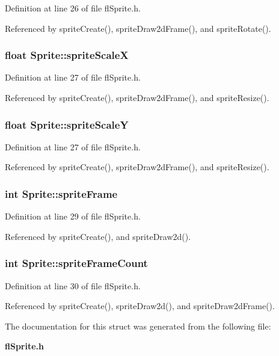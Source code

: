 Definition at line 26 of file fl\-Sprite.h.

Referenced by sprite\-Create(), sprite\-Draw2d\-Frame(), and sprite\-Rotate().
\subsubsection{\setlength{\rightskip}{0pt plus 5cm}float {\bf Sprite::sprite\-Scale\-X}}\label{structSprite_33570717a059bc615e310126bcacd72a}




Definition at line 27 of file fl\-Sprite.h.

Referenced by sprite\-Create(), sprite\-Draw2d\-Frame(), and sprite\-Resize().
\subsubsection{\setlength{\rightskip}{0pt plus 5cm}float {\bf Sprite::sprite\-Scale\-Y}}\label{structSprite_6e8db8b3dbfa9d54942f17b1720374b4}




Definition at line 27 of file fl\-Sprite.h.

Referenced by sprite\-Create(), sprite\-Draw2d\-Frame(), and sprite\-Resize().
\subsubsection{\setlength{\rightskip}{0pt plus 5cm}int {\bf Sprite::sprite\-Frame}}\label{structSprite_0fb5eef47c64f49c7f30d941ed2a96f6}




Definition at line 29 of file fl\-Sprite.h.

Referenced by sprite\-Create(), and sprite\-Draw2d().
\subsubsection{\setlength{\rightskip}{0pt plus 5cm}int {\bf Sprite::sprite\-Frame\-Count}}\label{structSprite_ddc1ed076c0d266807874a7e9f8f7880}




Definition at line 30 of file fl\-Sprite.h.

Referenced by sprite\-Create(), sprite\-Draw2d(), and sprite\-Draw2d\-Frame().

The documentation for this struct was generated from the following file:\begin{CompactItemize}
\item 
{\bf fl\-Sprite.h}\end{CompactItemize}
